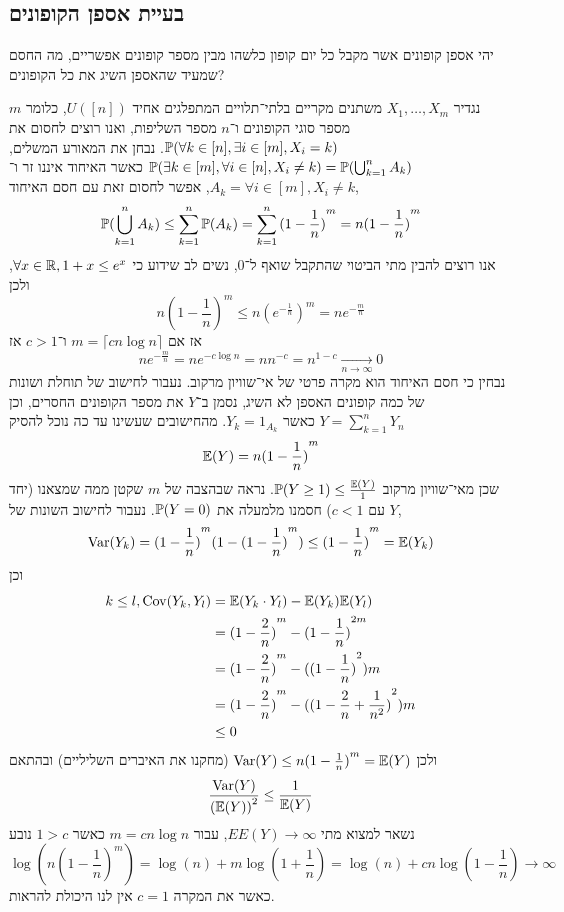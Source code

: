 \subsection{בעיית אספן הקופונים}
\begin{exercise}
	יהי אספן קופונים אשר מקבל כל יום קופון כלשהו מבין מספר קופונים אפשריים, מה החסם שמעיד שהאספן השיג את כל הקופונים? 
\end{exercise}
\begin{solution}
	נגדיר $X_1, \dots, X_m$ משתנים מקריים בלתי־תלויים המתפלגים אחיד $U([n])$, כלומר $m$ מספר סוגי הקופונים ו־$n$ מספר השליפות, ואנו רוצים לחסום את $\mathbb{P}(\forall k \in [n], \exists i \in [m], X_i = k)$.
	נבחן את המאורע המשלים, $\mathbb{P}(\exists k \in [m], \forall i \in [n], X_i \ne k) = \mathbb{P}(\bigcup_{k = 1}^n A_k)$ כאשר האיחוד איננו זר ו־$A_k = \forall i \in [m], X_i \ne k$, אפשר לחסום זאת עם חסם האיחוד,
	\[
		\mathbb{P}(\bigcup_{k = 1}^n A_k)
		\le \sum_{k = 1}^{n} \mathbb{P}(A_k)
		= \sum_{k = 1}^{n} {(1 - \frac{1}{n})}^m
		= n {(1 - \frac{1}{n})}^m
	\]
	אנו רוצים להבין מתי הביטוי שהתקבל שואף ל־$0$, נשים לב שידוע כי $\forall x \in \mathbb{R}, 1 + x \le e^x$, ולכן
	\[
		n {(1 - \frac{1}{n})}^m
		\le n {(e^{-\frac{1}{n}})}^m
		= n e^{-\frac{m}{n}}
	\]
	אז אם $m = \lceil cn \log n \rceil$ ו־$c > 1$ אז
	\[
		n e^{-\frac{m}{n}}
		= n e^{-c \log n}
		= n n^{-c}
		= n^{1 - c}
		\xrightarrow[n \to \infty]{} 0
	\]
	נבחין כי חסם האיחוד הוא מקרה פרטי של אי־שוויון מרקוב.
	נעבור לחישוב של תוחלת ושונות של כמה קופונים האספן לא השיג,
	נסמן ב־$Y$ את מספר הקופונים החסרים, וכן $Y = \sum_{k = 1}^{n} Y_n$ כאשר $Y_k = 1_{A_k}$.
	מהחישובים שעשינו עד כה נוכל להסיק
	\[
		\mathbb{E}(Y) = n {(1 - \frac{1}{n})}^m
	\]
	שכן מאי־שוויון מרקוב $\mathbb{P}(Y \ge 1) \le \frac{\mathbb{E}(Y)}{1}$.
	נראה שבהצבה של $m$ שקטן ממה שמצאנו (יחד עם $c < 1$) חסמנו מלמעלה את $\mathbb{P}(Y = 0)$. נעבור לחישוב השונות של $Y$,
	\[
		\operatorname{Var}(Y_k)
		= {(1 - \frac{1}{n})}^m (1 - {(1 - \frac{1}{n})}^m)
		\le {(1 - \frac{1}{n})}^m
		= \mathbb{E}(Y_k)
	\]
	וכן
	\begin{align*}
		k \le l,
		\operatorname{Cov}(Y_k, Y_l)
		& = \mathbb{E}(Y_k \cdot Y_l) - \mathbb{E}(Y_k) \mathbb{E}(Y_l) \\
		& = {(1 - \frac{2}{n})}^m - {(1 - \frac{1}{n})}^{2m} \\
		& = {(1 - \frac{2}{n})}^m - {({(1 - \frac{1}{n})}^{2})}m \\
		& = {(1 - \frac{2}{n})}^m - {({(1 - \frac{2}{n} + \frac{1}{n^2})}^{2})}m \\
		& \le 0
	\end{align*}
	ולכן $\operatorname{Var}(Y) \le n {(1 - \frac{1}{n})}^m = \mathbb{E}(Y)$ (מחקנו את האיברים השליליים) ובהתאם
	\[
		\frac{\operatorname{Var}(Y)}{{(\mathbb{E}(Y))}^2}
		\le \frac{1}{\mathbb{E}(Y)}
	\]
	נשאר למצוא מתי $EE(Y) \to \infty$,
	עבור $m = cn \log n$ כאשר $1 > c$ נובע
	\[
		\log(n {(1 - \frac{1}{n})}^m)
		= \log(n) + m \log(1 + \frac{1}{n})
		= \log(n) + cn \log(1 - \frac{1}{n}) \to \infty
	\]
	כאשר את המקרה $c = 1$ אין לנו היכולת להראות.
\end{solution}

